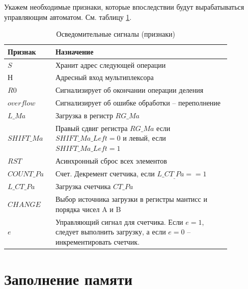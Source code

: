 \documentclass[a4paper,14pt]{extarticle}
\begin{document}
Укажем необходимые признаки, которые впоследствии будут вырабатываться управляющим автоматом. См. таблицу \ref{tab:signals5}.
\begin{table}[h!]
	\centering
	\small
	\begin{tabular}{|m{0.17\linewidth}|m{0.7\linewidth}|}
		\hline
		\textbf{Признак} & \textbf{Назначение} \\ \hline
		$S$ & Хранит адрес следующей операции \\ \hline
		$Н$ & Адресный вход мультиплексора \\ \hline
		$R0$ & Сигнализирует об окончании операции деления \\ \hline
		$overflow$ & Сигнализирует об ошибке обработки -- переполнение \\ \hline
		$L\_Ma$ & Загрузка в регистр $RG\_Ma$ \\ \hline
		$SHIFT\_Ma$ & Правый сдвиг регистра $RG\_Ma$ если $SHIFT\_Ma\_Left=0$ и левый, если  $SHIFT\_Ma\_Left=1$ \\ \hline
		$RST$ & Асинхронный сброс всех элементов \\ \hline
		$COUNT\_Pa$ & Счет. Декремент счетчика, если $L\_CT_\_Pa==1$ \\ \hline
		$L\_CT\_Pa$ & Загрузка счетчика $CT\_Pa$ \\ \hline
		$CHANGE$ & Выбор источника загрузки в регистры мантисс и порядка чисел A и B \\ \hline
		$e$ & Управляющий сигнал для счетчика. Если $e=1$, следует выполнить загрузку, а если $e=0$ -- инкрементировать счетчик. \\ \hline
	\end{tabular}
	\caption{Осведомительные сигналы (признаки)}
	\label{tab:signals5}
\end{table}

\fi



\section{Заполнение памяти}
\end{document}
